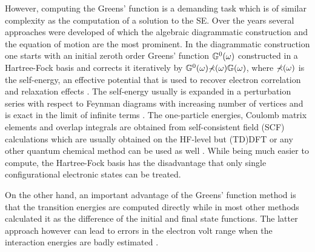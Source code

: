 {However, computing the Greens' function is a demanding task which is of similar complexity as the computation of a solution to the SE.
Over the years several approaches were developed of which the algebraic diagrammatic construction \cite{1pGFcederbaum} and the equation of motion \cite{PottsHolland,1pGFcederbaum} are the most prominent.
In the diagrammatic construction one starts with an initial zeroth order Greens' function $\mathbb{G}^0(\omega)$ constructed in a Hartree-Fock basis and corrects it iteratively by $\mathbb{G}^0(\omega)\mathbb{\Sigma}(\omega)\mathbb{G}(\omega)$, where $\mathbb{\Sigma}(\omega)$ is the self-energy, an effective potential that is used to recover electron correlation and relaxation effects \cite{GreenBayse}.
The self-energy usually is expanded in a perturbation series with respect to Feynman diagrams with increasing number of vertices and is exact in the limit of infinite terms \cite{bookGF,cederbADC}.
The one-particle energies, Coulomb matrix elements and overlap integrals are obtained from self-consistent field (SCF) calculations \cite{1pGFcederbaum} which are usually obtained on the HF-level \cite{GreenBayse} but (TD)DFT or any other quantum chemical method can be used as well \cite{Koerzd1}.
While being much easier to compute, the Hartree-Fock basis has the disadvantage that only single configurational electronic states can be treated.

On the other hand, an important advantage of the Greens' function method is that the transition energies are computed directly while in most other methods calculated it as the difference of the initial and final state functions.
The latter approach however can lead to errors in the electron volt range when the interaction energies are badly estimated \cite{1pGFcederbaum}.

}

